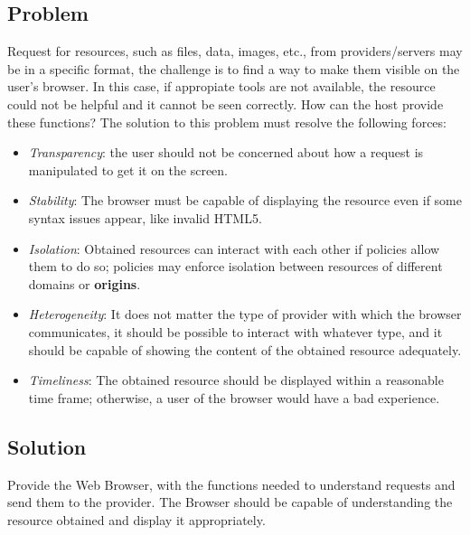 \documentclass[prodmode,acmtecs]{acmsmall}
\begin{document}
  \subsection*{Problem}
  Request for resources, such as files, data, images, etc., from providers/servers may be in a specific format, the challenge is to find a way to make them visible on the user's browser. In this case, if appropiate tools are not available, the resource could not be helpful and it cannot be seen correctly. How can the host provide these functions? The solution to this problem must resolve the following forces:
  \begin{itemize}
    \item \textit{Transparency}: the user should not be concerned about how a request is manipulated to get it on the screen.
    \item \textit{Stability}: The browser must be capable of displaying the resource even if some syntax issues appear, like invalid HTML5.
    \item \textit{Isolation}: Obtained resources can interact with each other if policies allow them to do so; policies may enforce isolation between resources of different domains or \textbf{origins}.
    \item \textit{Heterogeneity}: It does not matter the type of provider with which the browser communicates, it should be possible to interact with whatever type, and it should be capable of showing the content of the obtained resource adequately.
    \item \textit{Timeliness}: The obtained resource should be displayed within a reasonable time frame; otherwise, a user of the browser would have a bad experience.
  \end{itemize}

  \subsection*{Solution}
  Provide the Web Browser, with the functions needed to understand requests and send them to the provider. The Browser should be capable of understanding the resource obtained and display it appropriately. 
\end{document}
